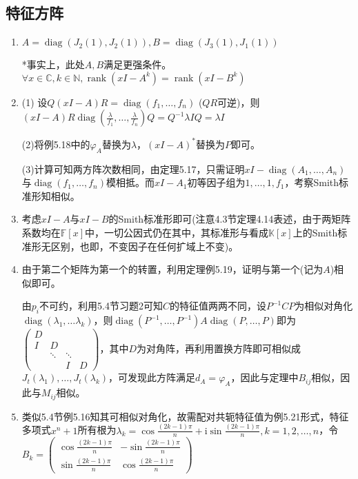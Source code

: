 \documentclass[a4paper,UTF8,fontset=windows]{ctexart}
\DeclareMathOperator{\diag}{diag}
\DeclareMathOperator{\rank}{rank}
\begin{document}
\subsection{特征方阵}
\begin{enumerate}
\item
$A=\diag\left(J_2(1),J_2(1)\right),B=\diag\left(J_3(1),J_1(1)\right)$

*事实上，此处$A,B$满足更强条件。$\forall x\in\mathbb{C},k\in\mathbb{N},\rank(xI-A^k)=\rank(xI-B^k)$

\item
(1) 设$Q(xI-A)R=\diag(f_1,\dots,f_n)$ ($QR$可逆)，则$(xI-A)R\diag\left(\frac{\lambda}{f_1},\dots,\frac{\lambda}{f_n}\right)Q=Q^{-1}\lambda IQ=\lambda I$

(2)将例5.18中的$\varphi_A$替换为$\lambda$，$(xI-A)^\ast$替换为$P$即可。

(3)计算可知两方阵次数相同，由定理5.17，只需证明$xI-\diag(A_1,\dots,A_n)$与$\diag(f_1,\dots,f_n)$模相抵。而$xI-A_1$初等因子组为$1,\dots,1,f_1$，考察Smith标准形知相似。

\item
考虑$xI-A$与$xI-B$的Smith标准形即可(注意4.3节定理4.14表述，由于两矩阵系数均在$\mathbb{F}[x]$中，一切公因式仍在其中，其标准形与看成$\mathbb{K}[x]$上的Smith标准形无区别，也即，不变因子在任何扩域上不变)。

\item
由于第二个矩阵为第一个的转置，利用定理例5.19，证明与第一个(记为$A$)相似即可。

由$p_i$不可约，利用5.4节习题2可知$C$的特征值两两不同，设$P^{-1}CP$为相似对角化$\diag(\lambda_1,\dots\lambda_k)$，则$\diag(P^{-1},\dots,P^{-1})A\diag(P,\dots,P)$即为$\begin{pmatrix}D&&&\\I&D&&\\&\ddots&\ddots&\\&&I&D\end{pmatrix}$，其中$D$为对角阵，再利用置换方阵即可相似成$J_t(\lambda_1),\dots,J_t(\lambda_k)$，可发现此方阵满足$d_A=\varphi_A$，因此与定理中$B_{ij}$相似，因此与$M_{ij}$相似。

\item
类似5.4节例5.16知其可相似对角化，故需配对共轭特征值为例5.21形式，特征多项式$x^n+1$所有根为$\lambda_k=\cos{\frac{(2k-1)\pi}{n}}+\mathrm{i}\sin{\frac{(2k-1)\pi}{n}},k=1,2,\dots,n$，令$B_k=\begin{pmatrix}\cos{\frac{(2k-1)\pi}{n}}&-\sin{\frac{(2k-1)\pi}{n}}\\[1.5ex]\sin{\frac{(2k-1)\pi}{n}}&\cos{\frac{(2k-1)\pi}{n}}\end{pmatrix}$


\end{enumerate}
\end{document}

